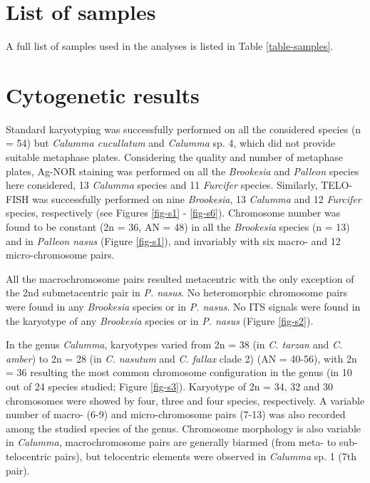 \documentclass[a4paper, 12pt]{article}
\begin{document}
\newpage
\section{List of samples}

A full list of samples used in the analyses is listed in Table \ref{table-samples}.



\newpage
\section{Cytogenetic results}
Standard karyotyping was successfully performed on all the considered species (n = 54) but \textit{Calumma cucullatum} and \textit{Calumma} sp. 4, which did not provide suitable metaphase plates.
Considering the quality and number of metaphase plates, Ag-NOR staining was performed on all the \textit{Brookesia} and \textit{Palleon} species here considered, 13 \textit{Calumma} species and 11 \textit{Furcifer} species. 
Similarly, TELO-FISH was successfully performed on nine \textit{Brookesia}, 13 \textit{Calumma} and 12 \textit{Furcifer} species, respectively (see Figures \ref{fig-s1} - \ref{fig-s6}).
Chromosome number was found to be constant (2n = 36, AN = 48) in all the \textit{Brookesia} species (n = 13) and in \textit{Palleon nasus} (Figure \ref{fig-s1}), and invariably with six macro- and 12 micro-chromosome pairs.

\noindent All the macrochromosome pairs resulted metacentric with the only exception of the 2nd submetacentric pair in \textit{P. nasus}. 
No heteromorphic chromosome pairs were found in any \textit{Brookesia} species or in \textit{P. nasus}.
No ITS signals were found in the karyotype of any \textit{Brookesia} species or in \textit{P. nasus} (Figure \ref{fig-s2}).

\noindent In the genus \textit{Calumma}, karyotypes varied from 2n = 38 (in \textit{C. tarzan} and \textit{C. amber}) to 2n = 28 (in \textit{C. nasutum} and \textit{C. fallax} clade 2) (AN = 40-56), with 2n = 36 resulting the most common chromosome configuration in the genus (in 10 out of 24 species studied; Figure \ref{fig-s3}). 
Karyotype of 2n = 34, 32 and 30 chromosomes were showed by four, three and four species, respectively. 
A variable number of macro- (6-9) and micro-chromosome pairs (7-13) was also recorded among the studied species of the genus. 
Chromosome morphology is also variable in \textit{Calumma}, macrochromosome pairs are generally biarmed (from meta- to sub-telocentric pairs), but telocentric elements were observed in \textit{Calumma} sp. 1 (7th pair). 
\end{document}
